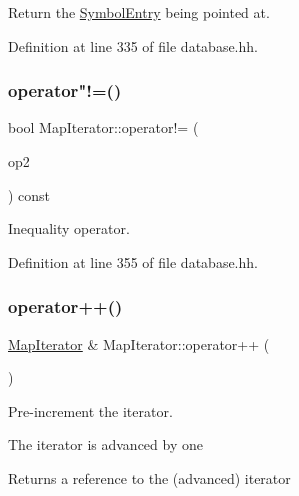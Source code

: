 Return the \mbox{\hyperlink{class_symbol_entry}{Symbol\+Entry}} being pointed at. 



Definition at line 335 of file database.\+hh.

\mbox{\label{class_map_iterator_a0c43c823c275b4c1f821360ba3eaf745}} 
\subsubsection{\texorpdfstring{operator"!=()}{operator!=()}}
{\footnotesize\ttfamily bool Map\+Iterator\+::operator!= (\begin{DoxyParamCaption}\item[{const \mbox{\hyperlink{class_map_iterator}{Map\+Iterator}} \&}]{op2 }\end{DoxyParamCaption}) const\hspace{0.3cm}{\ttfamily [inline]}}



Inequality operator. 



Definition at line 355 of file database.\+hh.

\mbox{\label{class_map_iterator_a4ecea040ac1d04ae13e91a183c7a0f98}} 
\subsubsection{\texorpdfstring{operator++()}{operator++()}\hspace{0.1cm}{\footnotesize\ttfamily [1/2]}}
{\footnotesize\ttfamily \mbox{\hyperlink{class_map_iterator}{Map\+Iterator}} \& Map\+Iterator\+::operator++ (\begin{DoxyParamCaption}\item[{void}]{ }\end{DoxyParamCaption})}



Pre-\/increment the iterator. 

The iterator is advanced by one \begin{DoxyReturn}{Returns}
a reference to the (advanced) iterator 
\end{DoxyReturn}


